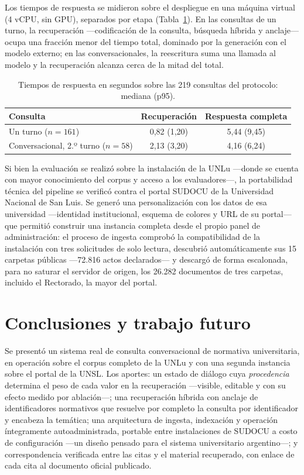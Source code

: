\documentclass{llncs}
\begin{document}
Los tiempos de respuesta se midieron sobre el despliegue en una máquina
virtual (4 vCPU, sin GPU), separados por etapa
(Tabla~\ref{tab:tiempos}). En las consultas de un turno, la recuperación
---codificación de la consulta, búsqueda híbrida y anclaje--- ocupa una fracción
menor del tiempo total, dominado por la generación con el modelo externo; en las
conversacionales, la reescritura suma una llamada al modelo y la recuperación
alcanza cerca de la mitad del total.

\begin{table}[H]
\centering\small\setlength{\tabcolsep}{9pt}
\caption{Tiempos de respuesta en segundos sobre las 219 consultas del
protocolo: mediana (p95).}
\label{tab:tiempos}
\begin{tabular}{lcc}
\toprule
Consulta & Recuperación & Respuesta completa \\
\midrule
Un turno ($n=161$)                  & 0{,}82 (1{,}20) & 5{,}44 (9{,}45) \\
Conversacional, 2.º turno ($n=58$) & 2{,}13 (3{,}20) & 4{,}16 (6{,}24) \\
\bottomrule
\end{tabular}
\end{table}

\label{sec:portabilidad}Si bien la evaluación se realizó sobre la
instalación de la UNLu ---donde se cuenta con mayor conocimiento del corpus y
acceso a los evaluadores---, la portabilidad técnica del pipeline se
verificó contra el portal SUDOCU de la Universidad Nacional de San Luis. Se generó una
personalización con los datos de esa universidad ---identidad institucional,
esquema de colores y URL de su portal--- que permitió construir una instancia
completa desde el propio panel de administración: el proceso de ingesta
comprobó la compatibilidad de la instalación con tres solicitudes de solo
lectura, descubrió automáticamente sus 15 carpetas públicas ---72.816
actos declarados--- y descargó de forma escalonada, para no saturar el
servidor de origen, los 26.282 documentos de tres carpetas, incluido el
Rectorado, la mayor del portal.

\section{Conclusiones y trabajo futuro}
\label{sec:conclusiones}

Se presentó un sistema real de consulta conversacional de normativa
universitaria, en operación sobre el corpus completo de la UNLu y con una
segunda instancia sobre el portal de la UNSL. Los aportes: un estado de
diálogo cuya \emph{procedencia} determina el peso de cada valor en la
recuperación ---visible, editable y con su efecto medido por ablación---;
una recuperación híbrida con anclaje de identificadores normativos que
resuelve por completo la consulta por identificador y encabeza la temática;
una arquitectura de ingesta, indexación y operación íntegramente
autoadministrada, portable entre instalaciones de SUDOCU a costo de
configuración ---un diseño pensado para el sistema universitario
argentino---; y correspondencia verificada entre las citas y el material recuperado, con
enlace de cada cita al documento oficial publicado.
\end{document}
